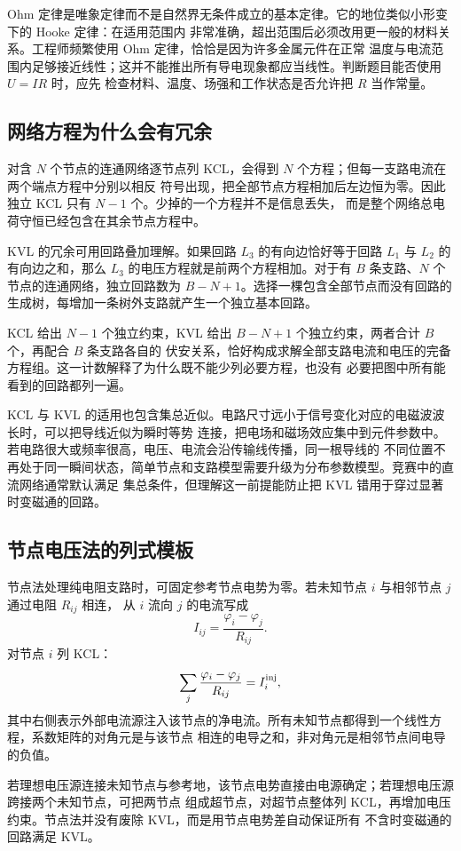 Ohm 定律是唯象定律而不是自然界无条件成立的基本定律。它的地位类似小形变下的 Hooke 定律：在适用范围内
非常准确，超出范围后必须改用更一般的材料关系。工程师频繁使用 Ohm 定律，恰恰是因为许多金属元件在正常
温度与电流范围内足够接近线性；这并不能推出所有导电现象都应当线性。判断题目能否使用 $U=IR$ 时，应先
检查材料、温度、场强和工作状态是否允许把 $R$ 当作常量。

\subsection*{网络方程为什么会有冗余}

对含 $N$ 个节点的连通网络逐节点列 KCL，会得到 $N$ 个方程；但每一支路电流在两个端点方程中分别以相反
符号出现，把全部节点方程相加后左边恒为零。因此独立 KCL 只有 $N-1$ 个。少掉的一个方程并不是信息丢失，
而是整个网络总电荷守恒已经包含在其余节点方程中。

KVL 的冗余可用回路叠加理解。如果回路 $L_3$ 的有向边恰好等于回路 $L_1$ 与 $L_2$ 的有向边之和，那么
$L_3$ 的电压方程就是前两个方程相加。对于有 $B$ 条支路、$N$ 个节点的连通网络，独立回路数为
$B-N+1$。选择一棵包含全部节点而没有回路的生成树，每增加一条树外支路就产生一个独立基本回路。

KCL 给出 $N-1$ 个独立约束，KVL 给出 $B-N+1$ 个独立约束，两者合计 $B$ 个，再配合 $B$ 条支路各自的
伏安关系，恰好构成求解全部支路电流和电压的完备方程组。这一计数解释了为什么既不能少列必要方程，也没有
必要把图中所有能看到的回路都列一遍。

KCL 与 KVL 的适用也包含集总近似。电路尺寸远小于信号变化对应的电磁波波长时，可以把导线近似为瞬时等势
连接，把电场和磁场效应集中到元件参数中。若电路很大或频率很高，电压、电流会沿传输线传播，同一根导线的
不同位置不再处于同一瞬间状态，简单节点和支路模型需要升级为分布参数模型。竞赛中的直流网络通常默认满足
集总条件，但理解这一前提能防止把 KVL 错用于穿过显著时变磁通的回路。

\subsection*{节点电压法的列式模板}

节点法处理纯电阻支路时，可固定参考节点电势为零。若未知节点 $i$ 与相邻节点 $j$ 通过电阻 $R_{ij}$ 相连，
从 $i$ 流向 $j$ 的电流写成
\begin{equation}
 I_{ij}=\frac{\varphi_i-\varphi_j}{R_{ij}}.
\end{equation}
对节点 $i$ 列 KCL：
\begin{equation}
 \sum_j\frac{\varphi_i-\varphi_j}{R_{ij}}=I_i^{\rm inj},
\end{equation}
其中右侧表示外部电流源注入该节点的净电流。所有未知节点都得到一个线性方程，系数矩阵的对角元是与该节点
相连的电导之和，非对角元是相邻节点间电导的负值。

若理想电压源连接未知节点与参考地，该节点电势直接由电源确定；若理想电压源跨接两个未知节点，可把两节点
组成超节点，对超节点整体列 KCL，再增加电压约束。节点法并没有废除 KVL，而是用节点电势差自动保证所有
不含时变磁通的回路满足 KVL。
